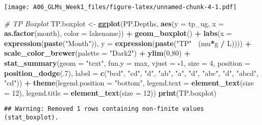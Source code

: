 \documentclass[]{article}
\newenvironment{Shaded}{\begin{snugshade}}{\end{snugshade}}
\newcommand{\KeywordTok}[1]{\textcolor[rgb]{0.13,0.29,0.53}{\textbf{#1}}}
\newcommand{\DataTypeTok}[1]{\textcolor[rgb]{0.13,0.29,0.53}{#1}}
\newcommand{\DecValTok}[1]{\textcolor[rgb]{0.00,0.00,0.81}{#1}}
\newcommand{\StringTok}[1]{\textcolor[rgb]{0.31,0.60,0.02}{#1}}
\newcommand{\CommentTok}[1]{\textcolor[rgb]{0.56,0.35,0.01}{\textit{#1}}}
\newcommand{\OperatorTok}[1]{\textcolor[rgb]{0.81,0.36,0.00}{\textbf{#1}}}
\newcommand{\NormalTok}[1]{#1}
\begin{document}
\texttt{[image: A06\_GLMs\_Week1\_files/figure-latex/unnamed-chunk-4-1.pdf]}

\begin{Shaded}
\begin{Highlighting}[]
\CommentTok{# TP Boxplot}
\NormalTok{TP.boxplot <-}\StringTok{ }
\StringTok{    }\KeywordTok{ggplot}\NormalTok{(PP.Depths, }\KeywordTok{aes}\NormalTok{(}\DataTypeTok{y =}\NormalTok{ tp_ug, }\DataTypeTok{x =} \KeywordTok{as.factor}\NormalTok{(month),  }\DataTypeTok{color =}\NormalTok{ lakename)) }\OperatorTok{+}
\StringTok{      }\KeywordTok{geom_boxplot}\NormalTok{() }\OperatorTok{+}
\StringTok{  }\KeywordTok{labs}\NormalTok{(}\DataTypeTok{x =} \KeywordTok{expression}\NormalTok{(}\KeywordTok{paste}\NormalTok{(}\StringTok{"Month"}\NormalTok{)),}
       \DataTypeTok{y =} \KeywordTok{expression}\NormalTok{(}\KeywordTok{paste}\NormalTok{(}\StringTok{"TP"}\OperatorTok{~}\StringTok{ }\NormalTok{(mu}\OperatorTok{*}\NormalTok{g }\OperatorTok{/}\StringTok{ }\NormalTok{L)))) }\OperatorTok{+}
\StringTok{  }\KeywordTok{scale_color_brewer}\NormalTok{(}\DataTypeTok{palette =} \StringTok{"Dark2"}\NormalTok{) }\OperatorTok{+}
\StringTok{  }\KeywordTok{ylim}\NormalTok{(}\DecValTok{0}\NormalTok{,}\DecValTok{80}\NormalTok{) }\OperatorTok{+}
\StringTok{      }\KeywordTok{stat_summary}\NormalTok{(}\DataTypeTok{geom =} \StringTok{"text"}\NormalTok{, }\DataTypeTok{fun.y =}\NormalTok{ max, }\DataTypeTok{vjust =} \OperatorTok{-}\DecValTok{1}\NormalTok{, }\DataTypeTok{size =} \DecValTok{4}\NormalTok{, }\DataTypeTok{position =} \KeywordTok{position_dodge}\NormalTok{(.}\DecValTok{7}\NormalTok{),}
                   \DataTypeTok{label =} \KeywordTok{c}\NormalTok{(}\StringTok{"bcd"}\NormalTok{, }\StringTok{"cd"}\NormalTok{, }\StringTok{"d"}\NormalTok{, }\StringTok{"ab"}\NormalTok{, }\StringTok{"a"}\NormalTok{, }\StringTok{"d"}\NormalTok{, }\StringTok{"abc"}\NormalTok{, }\StringTok{"d"}\NormalTok{, }\StringTok{"abcd"}\NormalTok{, }\StringTok{"cd"}\NormalTok{)) }\OperatorTok{+}
\StringTok{      }\KeywordTok{theme}\NormalTok{(}\DataTypeTok{legend.position =} \StringTok{"bottom"}\NormalTok{, }
        \DataTypeTok{legend.text =} \KeywordTok{element_text}\NormalTok{(}\DataTypeTok{size =} \DecValTok{12}\NormalTok{), }\DataTypeTok{legend.title =} \KeywordTok{element_text}\NormalTok{(}\DataTypeTok{size =} \DecValTok{12}\NormalTok{))}
\KeywordTok{print}\NormalTok{(TP.boxplot)}
\end{Highlighting}
\end{Shaded}

\begin{verbatim}
## Warning: Removed 1 rows containing non-finite values (stat_boxplot).
\end{verbatim}
\end{document}
